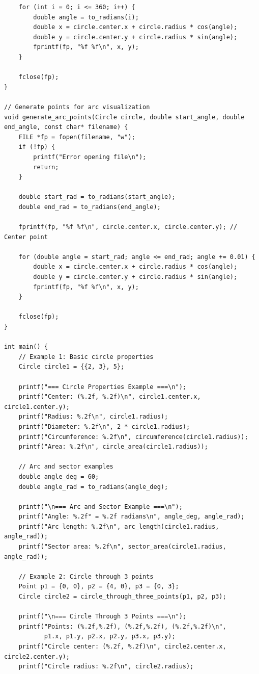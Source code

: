 \documentclass[a4paper,14pt]{article}
\begin{document}
{\begin{verbatim}
    for (int i = 0; i <= 360; i++) {
        double angle = to_radians(i);
        double x = circle.center.x + circle.radius * cos(angle);
        double y = circle.center.y + circle.radius * sin(angle);
        fprintf(fp, "%f %f\n", x, y);
    }

    fclose(fp);
}

// Generate points for arc visualization
void generate_arc_points(Circle circle, double start_angle, double end_angle, const char* filename) {
    FILE *fp = fopen(filename, "w");
    if (!fp) {
        printf("Error opening file\n");
        return;
    }

    double start_rad = to_radians(start_angle);
    double end_rad = to_radians(end_angle);

    fprintf(fp, "%f %f\n", circle.center.x, circle.center.y); // Center point

    for (double angle = start_rad; angle <= end_rad; angle += 0.01) {
        double x = circle.center.x + circle.radius * cos(angle);
        double y = circle.center.y + circle.radius * sin(angle);
        fprintf(fp, "%f %f\n", x, y);
    }

    fclose(fp);
}

int main() {
    // Example 1: Basic circle properties
    Circle circle1 = {{2, 3}, 5};

    printf("=== Circle Properties Example ===\n");
    printf("Center: (%.2f, %.2f)\n", circle1.center.x, circle1.center.y);
    printf("Radius: %.2f\n", circle1.radius);
    printf("Diameter: %.2f\n", 2 * circle1.radius);
    printf("Circumference: %.2f\n", circumference(circle1.radius));
    printf("Area: %.2f\n", circle_area(circle1.radius));

    // Arc and sector examples
    double angle_deg = 60;
    double angle_rad = to_radians(angle_deg);

    printf("\n=== Arc and Sector Example ===\n");
    printf("Angle: %.2f° = %.2f radians\n", angle_deg, angle_rad);
    printf("Arc length: %.2f\n", arc_length(circle1.radius, angle_rad));
    printf("Sector area: %.2f\n", sector_area(circle1.radius, angle_rad));

    // Example 2: Circle through 3 points
    Point p1 = {0, 0}, p2 = {4, 0}, p3 = {0, 3};
    Circle circle2 = circle_through_three_points(p1, p2, p3);

    printf("\n=== Circle Through 3 Points ===\n");
    printf("Points: (%.2f,%.2f), (%.2f,%.2f), (%.2f,%.2f)\n",
           p1.x, p1.y, p2.x, p2.y, p3.x, p3.y);
    printf("Circle center: (%.2f, %.2f)\n", circle2.center.x, circle2.center.y);
    printf("Circle radius: %.2f\n", circle2.radius);


\end{verbatim}}
\end{document}
